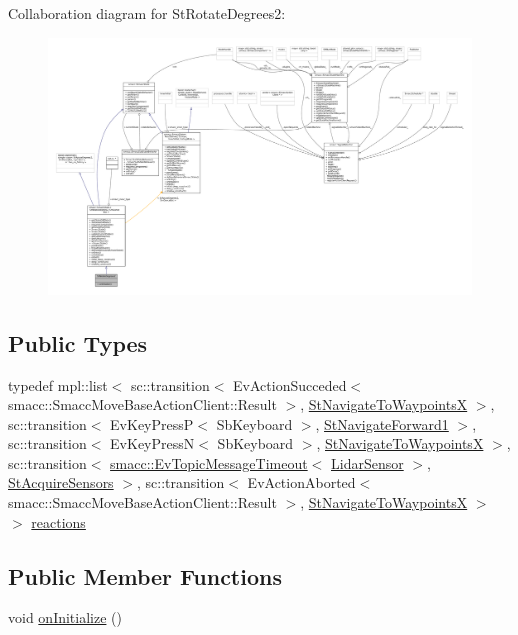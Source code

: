 Collaboration diagram for St\+Rotate\+Degrees2\+:
\nopagebreak
\begin{figure}[H]
\begin{center}
\leavevmode
\includegraphics[width=350pt]{structStRotateDegrees2__coll__graph}
\end{center}
\end{figure}
\subsection*{Public Types}
\begin{DoxyCompactItemize}
\item 
typedef mpl\+::list$<$ sc\+::transition$<$ Ev\+Action\+Succeded$<$ smacc\+::\+Smacc\+Move\+Base\+Action\+Client\+::\+Result $>$, \hyperlink{structStNavigateToWaypointsX}{St\+Navigate\+To\+WaypointsX} $>$, sc\+::transition$<$ Ev\+Key\+PressP$<$ Sb\+Keyboard $>$, \hyperlink{structStNavigateForward1}{St\+Navigate\+Forward1} $>$, sc\+::transition$<$ Ev\+Key\+PressN$<$ Sb\+Keyboard $>$, \hyperlink{structStNavigateToWaypointsX}{St\+Navigate\+To\+WaypointsX} $>$, sc\+::transition$<$ \hyperlink{structsmacc_1_1EvTopicMessageTimeout}{smacc\+::\+Ev\+Topic\+Message\+Timeout}$<$ \hyperlink{sensor__state_8h_a9db9e1944f88de79507758d08e4a2ee3}{Lidar\+Sensor} $>$, \hyperlink{structStAcquireSensors}{St\+Acquire\+Sensors} $>$, sc\+::transition$<$ Ev\+Action\+Aborted$<$ smacc\+::\+Smacc\+Move\+Base\+Action\+Client\+::\+Result $>$, \hyperlink{structStNavigateToWaypointsX}{St\+Navigate\+To\+WaypointsX} $>$ $>$ \hyperlink{structStRotateDegrees2_ac3bd3033daf8d0190003cae05ae9a0bb}{reactions}
\end{DoxyCompactItemize}
\subsection*{Public Member Functions}
\begin{DoxyCompactItemize}
\item 
void \hyperlink{structStRotateDegrees2_a6fa87a927ab3eac0fd2f609f66ec355a}{on\+Initialize} ()
\end{DoxyCompactItemize}
